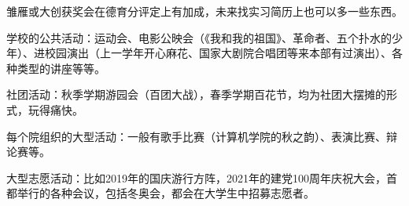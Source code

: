 雏雁或大创获奖会在德育分评定上有加成，未来找实习简历上也可以多一些东西。


学校的公共活动：运动会、电影公映会（《我和我的祖国》、革命者、五个扑水的少年）、进校园演出（上一学年开心麻花、国家大剧院合唱团等来本部有过演出）、各种类型的讲座等等。

社团活动：秋季学期游园会（百团大战），春季学期百花节，均为社团大摆摊的形式，玩得痛快。

每个院组织的大型活动：一般有歌手比赛（计算机学院的秋之韵）、表演比赛、辩论赛等。

大型志愿活动：比如2019年的国庆游行方阵，2021年的建党100周年庆祝大会，首都举行的各种会议，包括冬奥会，都会在大学生中招募志愿者。
